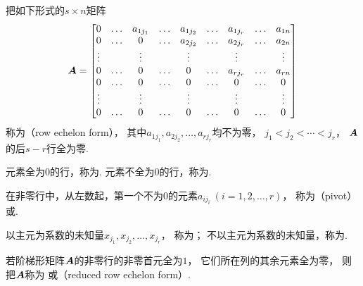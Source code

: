 \begin{definition}
把如下形式的\(s \times n\)矩阵\begin{equation*}
	\boldsymbol{A} = \begin{bmatrix}
		0 & \dots & a_{1 j_1} & \dots & a_{1 j_2} & \dots & a_{1 j_r} & \dots & a_{1n} \\
		0 & \dots & 0 & \dots & a_{2 j_2} & \dots & a_{2 j_r} & \dots & a_{2n} \\
		\vdots & & \vdots & & \vdots & & \vdots & & \vdots \\
		0 & \dots & 0 & \dots & 0 & \dots & a_{r j_r} & \dots & a_{rn} \\
		0 & \dots & 0 & \dots & 0 & \dots & 0 & \dots & 0 \\
		\vdots & & \vdots & & \vdots & & \vdots & & \vdots \\
		0 & \dots & 0 & \dots & 0 & \dots & 0 & \dots & 0 \\
	\end{bmatrix}
\end{equation*}
称为（row echelon form），
其中\(a_{1 j_1},a_{2 j_2},\dotsc,a_{r j_r}\)均不为零，
\(j_1 < j_2 < \dotsb < j_r\)，
\(\boldsymbol{A}\)的后\(s-r\)行全为零.

元素全为\(0\)的行，称为.
元素不全为\(0\)的行，称为.

在非零行中，从左数起，第一个不为\(0\)的元素\(a_{i j_i}\ (i=1,2,\dotsc,r)\)，
称为（pivot）或.

以主元为系数的未知量\(x_{j_1},x_{j_2},\dotsc,x_{j_r}\)，
称为；
不以主元为系数的未知量，称为.
\end{definition}

\begin{definition}
若阶梯形矩阵\(\boldsymbol{A}\)的非零行的非零首元全为\(1\)，
它们所在列的其余元素全为零，
则把\(\boldsymbol{A}\)称为%
或（reduced row echelon form）.
\end{definition}


